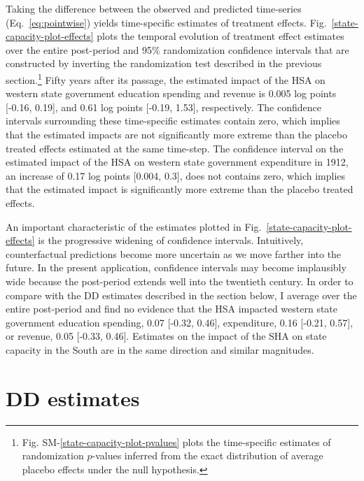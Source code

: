 \documentclass[12pt]{article}
\begin{document}
Taking the difference between the observed and predicted time-series (Eq.~\ref{eq:pointwise}) yields time-specific estimates of treatment effects. Fig.~\ref{state-capacity-plot-effects} plots the temporal evolution of treatment effect estimates over the entire post-period and 95\% randomization confidence intervals that are constructed by inverting the randomization test described in the previous section.\footnote{Fig. SM-\ref{state-capacity-plot-pvalues} plots the time-specific estimates of randomization $p$-values inferred from the exact distribution of average placebo effects under the null hypothesis.} Fifty years after its passage, the estimated impact of the HSA on western state government education spending and revenue is 0.005 log points [-0.16, 0.19], and 0.61 log points [-0.19, 1.53], respectively. The confidence intervals surrounding these time-specific estimates contain zero, which implies that the estimated impacts are not significantly more extreme than the placebo treated effects estimated at the same time-step. The confidence interval on the estimated impact of the HSA on western state government expenditure in 1912, an increase of 0.17 log points [0.004, 0.3], does not contains zero, which implies that the estimated impact is significantly more extreme than the placebo treated effects. 

An important characteristic of the estimates plotted in Fig.~\ref{state-capacity-plot-effects} is the progressive widening of confidence intervals. Intuitively, counterfactual predictions become more uncertain as we move farther into the future. In the present application, confidence intervals may become implausibly wide because the post-period extends well into the twentieth century. In order to compare with the DD estimates described in the section below, I average over the entire post-period and find no evidence that the HSA impacted western state government education spending, 0.07 [-0.32, 0.46], expenditure, 0.16 [-0.21, 0.57], or revenue, 0.05 [-0.33, 0.46]. Estimates on the impact of the SHA on state capacity in the South are in the same direction and similar magnitudes. 

\section{DD estimates} \label{DD}
\end{document}
